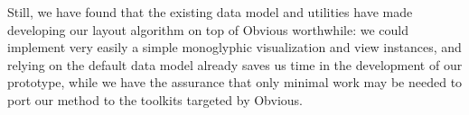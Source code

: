 Still, we have found that the existing data model and utilities have made developing our layout algorithm on top of Obvious worthwhile: we could implement very easily a simple monoglyphic visualization and view instances, and relying on the default data model already saves us time in the development of our prototype, while we have the assurance that only minimal work may be needed to port our method to the toolkits targeted by Obvious.
